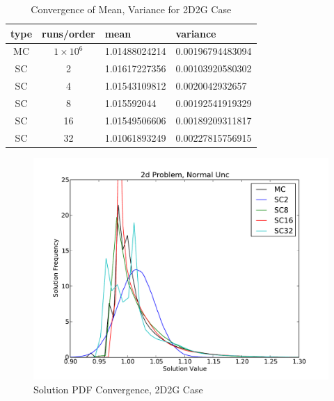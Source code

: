 \begin{table}
\begin{center}
\begin{tabular}{c c|l l}
type & runs/order & mean & variance \\ \hline
MC & $1\times10^6$ & 1.01488024214 & 0.00196794483094 \\
SC & 2 & 1.01617227356 & 0.00103920580302 \\
SC & 4 & 1.01543109812 & 0.0020042932657 \\
SC & 8 & 1.015592044 & 0.00192541919329 \\
SC & 16 & 1.01549506606 & 0.00189209311817 \\
SC & 32 & 1.01061893249 & 0.00227815756915
\end{tabular}
\end{center}
\caption{Convergence of Mean, Variance for 2D2G Case}
\label{tab:2dcrit}
\end{table}

\begin{figure}[h!]
\centering
   \includegraphics[width=\textwidth]{../graphics/2d_normal_pdfs}
   \caption{Solution PDF Convergence, 2D2G Case}
   \label{fig:2dcrit}
\end{figure}


%
%
